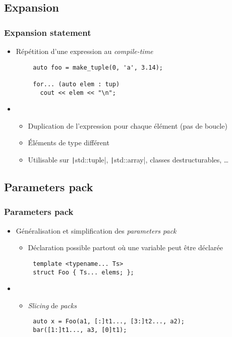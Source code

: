 \documentclass[C++.tex]{subfiles}
\begin{document}
\subsection*{Expansion}
\begin{frame}[fragile]
	\frametitle{Expansion statement}
	\begin{itemize}
		\item Répétition d'une expression au \textit{compile-time}
	\end{itemize}

	\begin{verbatim}
		auto foo = make_tuple(0, 'a', 3.14);

		for... (auto elem : tup)
		  cout << elem << "\n";
	\end{verbatim}

	\begin{itemize}
		\item []
		\begin{itemize}
			\item Duplication de l'expression pour chaque élément (pas de boucle)
			\item Éléments de type différent
			\item Utilisable sur \texttt|std::tuple|, \texttt|std::array|, classes destructurables, \ldots{}
		\end{itemize}
	\end{itemize}
\end{frame}

\subsection*{Parameters pack}
\begin{frame}[fragile]
	\frametitle{Parameters pack}
	\begin{itemize}
		\item Généralisation et simplification des \textit{parameters pack}
		\begin{itemize}
			\item Déclaration possible partout où une variable peut être déclarée
		\end{itemize}
	\end{itemize}

	\begin{verbatim}
		template <typename... Ts>
		struct Foo { Ts... elems; };
	\end{verbatim}

	\begin{itemize}
		\item []
		\begin{itemize}
			\item \textit{Slicing} de \textit{packs}
		\end{itemize}
	\end{itemize}

	\begin{verbatim}
		auto x = Foo(a1, [:]t1..., [3:]t2..., a2);
		bar([1:]t1..., a3, [0]t1);
	\end{verbatim}

\end{frame}
\end{document}
